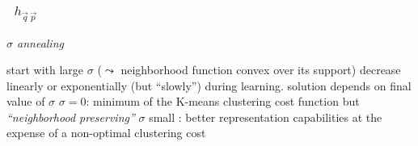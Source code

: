 \begin{frame}[t] \frametitle{\subsecname~$h_{\vec{q} \, \vec{p}}$} 
\emph{$\sigma$ annealing}
\begin{itemize}
      \itr start with large
        $\sigma$  ($\leadsto$ neighborhood function convex over
        its support)
      \itr decrease linearly or exponentially (but
        ``slowly'') during learning.
       \itr solution depends on 
        final value of $\sigma$
        \vspace{0.5cm}
       \itr $\sigma = 0$: minimum of the K-means clustering cost function but 
            \emph{``neighborhood preserving''}  \itr $\sigma$ small : better representation capabilities at the expense of a non-optimal clustering cost 
\end{itemize}


\end{frame}

